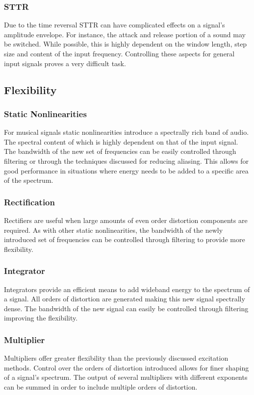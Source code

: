 		\subsubsection*{STTR}
			Due to the time reversal STTR can have complicated effects on a signal's amplitude envelope.
			For instance, the attack and release portion of a sound may be switched. While possible, this is
			highly dependent on the window length, step size and content of the input frequency. Controlling
			these aspects for general input signals proves a very difficult task.

	\subsection{Flexibility}
	\label{sec:ExcitationEvaluation-Comparison-Flexibility}
		\subsubsection*{Static Nonlinearities}
			For musical signals static nonlinearities introduce a spectrally rich band of audio. The spectral
			content of which is highly dependent on that of the input signal. The bandwidth of the new set of
			frequencies can be easily controlled through filtering or through the techniques discussed for
			reducing aliasing. This allows for good performance in situations where energy needs to be added to
			a specific area of the spectrum. 

		\subsubsection*{Rectification}
			Rectifiers are useful when large amounts of even order distortion components are required. As with
			other static nonlinearities, the bandwidth of the newly introduced set of frequencies can be
			controlled through filtering to provide more flexibility. 

		\subsubsection*{Integrator}
			Integrators provide an efficient means to add wideband energy to the spectrum of a signal. All
			orders of distortion are generated making this new signal spectrally dense. The bandwidth of the
			new signal can easily be controlled through filtering improving the flexibility.

		\subsubsection*{Multiplier}
			Multipliers offer greater flexibility than the previously discussed excitation methods. Control
			over the orders of distortion introduced allows for finer shaping of a signal's spectrum. The
			output of several multipliers with different exponents can be summed in order to include multiple
			orders of distortion.

